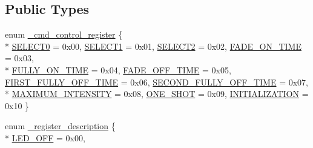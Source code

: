 \subsection*{Public Types}
\begin{DoxyCompactItemize}
\item 
enum \hyperlink{classsmrtobj_1_1i2c_1_1_t_c_a6507_a2b771c2f4975065352874dc67f7d701d}{\+\_\+cmd\+\_\+control\+\_\+register} \{ \\*
\hyperlink{classsmrtobj_1_1i2c_1_1_t_c_a6507_a2b771c2f4975065352874dc67f7d701dac115aeb0ec43a2d83c19d4e7ebfcc019}{S\+E\+L\+E\+C\+T0} = 0x00, 
\hyperlink{classsmrtobj_1_1i2c_1_1_t_c_a6507_a2b771c2f4975065352874dc67f7d701da80e0d021063c8c95043a18096a6f55f6}{S\+E\+L\+E\+C\+T1} = 0x01, 
\hyperlink{classsmrtobj_1_1i2c_1_1_t_c_a6507_a2b771c2f4975065352874dc67f7d701da5d235daea8e318dd0019d311b61356e5}{S\+E\+L\+E\+C\+T2} = 0x02, 
\hyperlink{classsmrtobj_1_1i2c_1_1_t_c_a6507_a2b771c2f4975065352874dc67f7d701dadbe07d59e0b42489fe4630e742474706}{F\+A\+D\+E\+\_\+\+O\+N\+\_\+\+T\+I\+M\+E} = 0x03, 
\\*
\hyperlink{classsmrtobj_1_1i2c_1_1_t_c_a6507_a2b771c2f4975065352874dc67f7d701da3ee378f498643771b6ca05f694f958df}{F\+U\+L\+L\+Y\+\_\+\+O\+N\+\_\+\+T\+I\+M\+E} = 0x04, 
\hyperlink{classsmrtobj_1_1i2c_1_1_t_c_a6507_a2b771c2f4975065352874dc67f7d701da41b2e6199f4780872cb7258e68778a38}{F\+A\+D\+E\+\_\+\+O\+F\+F\+\_\+\+T\+I\+M\+E} = 0x05, 
\hyperlink{classsmrtobj_1_1i2c_1_1_t_c_a6507_a2b771c2f4975065352874dc67f7d701da19da634d7d0500d0183c84b38a27913b}{F\+I\+R\+S\+T\+\_\+\+F\+U\+L\+L\+Y\+\_\+\+O\+F\+F\+\_\+\+T\+I\+M\+E} = 0x06, 
\hyperlink{classsmrtobj_1_1i2c_1_1_t_c_a6507_a2b771c2f4975065352874dc67f7d701dad71604546cc54ed7555ef07cde91eabb}{S\+E\+C\+O\+N\+D\+\_\+\+F\+U\+L\+L\+Y\+\_\+\+O\+F\+F\+\_\+\+T\+I\+M\+E} = 0x07, 
\\*
\hyperlink{classsmrtobj_1_1i2c_1_1_t_c_a6507_a2b771c2f4975065352874dc67f7d701daaf48f3426047c446eaba5ec6794882a2}{M\+A\+X\+I\+M\+U\+M\+\_\+\+I\+N\+T\+E\+N\+S\+I\+T\+Y} = 0x08, 
\hyperlink{classsmrtobj_1_1i2c_1_1_t_c_a6507_a2b771c2f4975065352874dc67f7d701daade32326b81b35ec16d594c1ec889e59}{O\+N\+E\+\_\+\+S\+H\+O\+T} = 0x09, 
\hyperlink{classsmrtobj_1_1i2c_1_1_t_c_a6507_a2b771c2f4975065352874dc67f7d701daf19ec560d33bb6cc1765341b8a4016d9}{I\+N\+I\+T\+I\+A\+L\+I\+Z\+A\+T\+I\+O\+N} = 0x10
 \}
\item 
enum \hyperlink{classsmrtobj_1_1i2c_1_1_t_c_a6507_a22d31cb7c3a277375d30c8ae5de03989}{\+\_\+register\+\_\+description} \{ \\*
\hyperlink{classsmrtobj_1_1i2c_1_1_t_c_a6507_a22d31cb7c3a277375d30c8ae5de03989a6368505486a80eb65a7857e0abc579ad}{L\+E\+D\+\_\+\+O\+F\+F} = 0x00, 

\end{DoxyCompactItemize}
